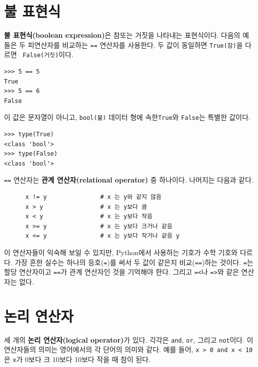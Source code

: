 \documentclass[10pt]{book}
\begin{document}
\section{불 표현식}

{\bf 불 표현식(boolean expression)}은 참또는 거짓을 나타내는
표현식이다.  다음의 예들은 두 피연산자를 비교하는 {\tt ==} 연산자를
사용한다.  두 값이 동일하면 {\tt True(참)}을 다르면 {\tt
  False(거짓)}이다.

\begin{verbatim}
>>> 5 == 5
True
>>> 5 == 6
False
\end{verbatim}
%
이 값은 문자열이 아니고, {\tt bool(불)} 데이터 형에 속한{\tt True}와
{\tt False}는 특별한 값이다.

\begin{verbatim}
>>> type(True)
<class 'bool'>
>>> type(False)
<class 'bool'>
\end{verbatim}
%
{\tt ==} 연산자는 {\bf 관계 연산자(relational operator)} 중 하나이다.
나머지는 다음과 같다.

\begin{verbatim}
      x != y               # x 는 y와 같지 않음
      x > y                # x 는 y보다 큼
      x < y                # x 는 y보다 작음
      x >= y               # x 는 y보다 크거나 같음
      x <= y               # x 는 y보다 작거나 같음 y
\end{verbatim}
%
이 연산자들이 익숙해 보일 수 있지만, Python에서 사용하는 기호가 수학
기호와 다르다.  가장 흔한 실수는 하나의 등호({\tt =})를 써서 두 값이
같은지 비교({\tt ==})하는 것이다.  {\tt =}는 할당 연산자이고 {\tt ==}가
관계 연산자인 것을 기억해야 한다.  그리고 {\tt =<}나 {\tt =>}와 같은
연산자는 없다.



\section {논리 연산자}
  세 개의 {\bf 논리
  연산자(logical operator)}가 있다. 각각은 {\tt and}, {\tt or}, 그리고
{\tt not}이다.  이 연산자들의 의미는 영어에서의 각 단어의 의미와 같다.
예를 들어, {\tt x > 0 and x < 10} 은 {\tt x}가 0보다 크{} 10보다
10보다 작을 때 참이 된다.
\end{document}

